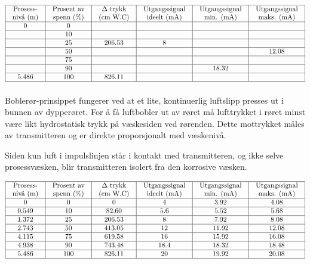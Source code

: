 $$\vbox{\offinterlineskip
\halign{\strut
\vrule \quad\hfil # \ \hfil & 
\vrule \quad\hfil # \ \hfil & 
\vrule \quad\hfil # \ \hfil & 
\vrule \quad\hfil # \ \hfil & 
\vrule \quad\hfil # \ \hfil & 
\vrule \quad\hfil # \ \hfil \vrule \cr
\noalign{\hrule}
%
Prosess- & Prosent av & $\Delta$ trykk & Utgangssignal & Utgangssignal & Utgangssignal \cr
%
nivå (m) & spenn (\%) & (cm W.C) & ideelt (mA) & min. (mA) & maks. (mA) \cr
%
\noalign{\hrule}
%
0  & 0 &  &  &  &  \cr
%
\noalign{\hrule}
%
  & 10 &  &  &  &  \cr
%
\noalign{\hrule}
%
  & 25 & 206.53 & 8 &  &  \cr
%
\noalign{\hrule}
%
  & 50 &  &  &  & 12.08 \cr
%
\noalign{\hrule}
%
  & 75 &  &  &  &  \cr
%
\noalign{\hrule}
%
  & 90 &  &  & 18.32 &  \cr
%
\noalign{\hrule}
%
5.486 & 100 & 826.11 &  &  &  \cr
%
\noalign{\hrule}
} %
}$$ %







Boblerør-prinsippet fungerer ved at et lite, kontinuerlig luftslipp presses ut i bunnen av dypperøret.  For å få luftbobler ut av røret må lufttrykket i røret minst være likt hydrostatisk trykk på væskesiden ved rørenden.  Dette mottrykket måles av transmitteren og er direkte proporsjonalt med væskenivå.

Siden kun luft i impulslinjen står i kontakt med transmitteren, og ikke selve prosessvæsken, blir transmitteren isolert fra den korrosive væsken.

\vskip 10pt


$$\vbox{\offinterlineskip
\halign{\strut
\vrule \quad\hfil # \ \hfil & 
\vrule \quad\hfil # \ \hfil & 
\vrule \quad\hfil # \ \hfil & 
\vrule \quad\hfil # \ \hfil & 
\vrule \quad\hfil # \ \hfil & 
\vrule \quad\hfil # \ \hfil \vrule \cr
\noalign{\hrule}
%
Prosess- & Prosent av & $\Delta$ trykk & Utgangssignal & Utgangssignal & Utgangssignal \cr
%
nivå (m) & spenn (\%) & (cm W.C) & ideelt (mA) & min. (mA) & maks. (mA) \cr
%
\noalign{\hrule}
%
0 & 0 & 0 & 4 & 3.92 & 4.08 \cr
%
\noalign{\hrule}
%
0.549 & 10 & 82.60 & 5.6 & 5.52 & 5.68 \cr
%
\noalign{\hrule}
%
1.372 & 25 & 206.53 & 8 & 7.92 & 8.08 \cr
%
\noalign{\hrule}
%
2.743 & 50 & 413.05 & 12 & 11.92 & 12.08 \cr
%
\noalign{\hrule}
%
4.115 & 75 & 619.58 & 16 & 15.92 & 16.08 \cr
%
\noalign{\hrule}
%
4.938 & 90 & 743.48 & 18.4 & 18.32 & 18.48 \cr
%
\noalign{\hrule}
%
5.486 & 100 & 826.11 & 20 & 19.92 & 20.08 \cr
%
\noalign{\hrule}
} %
}$$ %


